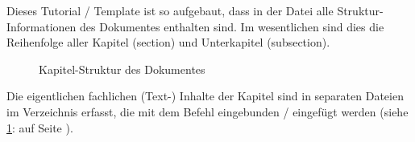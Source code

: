Dieses Tutorial / Template ist so aufgebaut, dass in der Datei  alle Struktur-Informationen des Dokumentes enthalten sind. Im wesentlichen sind dies die Reihenfolge aller Kapitel (section) und Unterkapitel (subsection).

\begin{figure}[h!]
\centering
  \caption{Kapitel-Struktur des Dokumentes}
  \label{fig:KapitelStruktur}
\end{figure} 

Die eigentlichen fachlichen (Text-) Inhalte der Kapitel sind in separaten  Dateien im Verzeichnis  erfasst, die mit dem Befehl  eingebunden / eingefügt werden (siehe \cref{fig:KapitelStruktur}:  auf Seite \pageref{fig:KapitelStruktur}).
